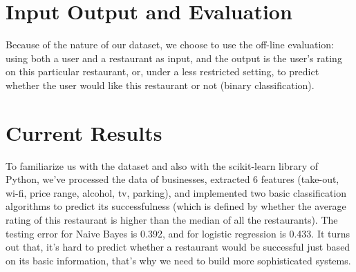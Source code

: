 \documentclass[12pt]{article}
\begin{document}
\section*{Input Output and Evaluation}
Because of the nature of our dataset, we choose to use the off-line evaluation: using both a user and a restaurant as input, and the output is the user's rating on this particular restaurant, or, under a less restricted setting, to predict whether the user would like this restaurant or not (binary classification). 

\section*{Current Results}
To familiarize us with the dataset and also with the scikit-learn library of Python, we've processed the data of businesses, extracted 6 features (take-out, wi-fi, price range, alcohol, tv, parking), and implemented two basic classification algorithms to predict its successfulness (which is defined by whether the average rating of this restaurant is higher than the median of all the restaurants). The testing error for Naive Bayes is 0.392, and for logistic regression is 0.433. It turns out that, it's hard to predict whether a restaurant would be successful just based on its basic information, that's why we need to build more sophisticated systems.
\end{document}
